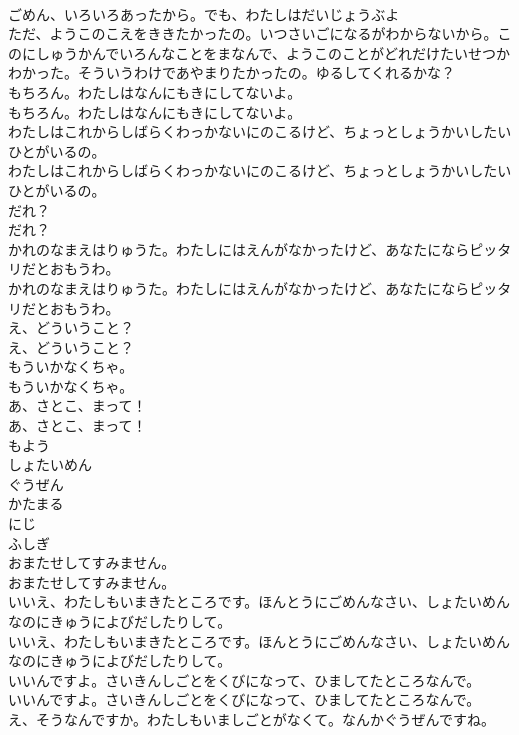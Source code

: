 \documentclass[8pt]{extreport}
\begin{document}
\begin{CJK}{UTF8}{min}
\\	ごめん、いろいろあったから。でも、わたしはだいじょうぶよ
\\	ただ、ようこのこえをききたかったの。いつさいごになるがわからないから。このにしゅうかんでいろんなことをまなんで、ようこのことがどれだけたいせつかわかった。そういうわけであやまりたかったの。ゆるしてくれるかな？
\\	もちろん。わたしはなんにもきにしてないよ。
\\	もちろん。わたしはなんにもきにしてないよ。
\\	わたしはこれからしばらくわっかないにのこるけど、ちょっとしょうかいしたいひとがいるの。
\\	わたしはこれからしばらくわっかないにのこるけど、ちょっとしょうかいしたいひとがいるの。
\\	だれ？
\\	だれ？
\\	かれのなまえはりゅうた。わたしにはえんがなかったけど、あなたにならピッタリだとおもうわ。
\\	かれのなまえはりゅうた。わたしにはえんがなかったけど、あなたにならピッタリだとおもうわ。
\\	え、どういうこと？
\\	え、どういうこと？
\\	もういかなくちゃ。
\\	もういかなくちゃ。
\\	あ、さとこ、まって！
\\	あ、さとこ、まって！
\\	もよう
\\	しょたいめん
\\	ぐうぜん
\\	かたまる
\\	にじ
\\	ふしぎ
\\	おまたせしてすみません。
\\	おまたせしてすみません。
\\	いいえ、わたしもいまきたところです。ほんとうにごめんなさい、しょたいめんなのにきゅうによびだしたりして。
\\	いいえ、わたしもいまきたところです。ほんとうにごめんなさい、しょたいめんなのにきゅうによびだしたりして。
\\	いいんですよ。さいきんしごとをくびになって、ひましてたところなんで。
\\	いいんですよ。さいきんしごとをくびになって、ひましてたところなんで。
\\	え、そうなんですか。わたしもいましごとがなくて。なんかぐうぜんですね。

\end{CJK}
\end{document}

